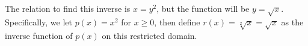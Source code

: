 \documentclass{ximera}
\begin{document}
%
%        
%           
%           
%
%        
%

The relation to find this inverse is $x=y^2$, but the function will be $y = \sqrt{x}$. Specifically, we let $p(x) = x^2$ for $x \geq 0$, then define $r(x) = \sqrt[2]{x} = \sqrt{x}$ as the inverse function of $p(x)$ on this restricted domain.
\end{document}
